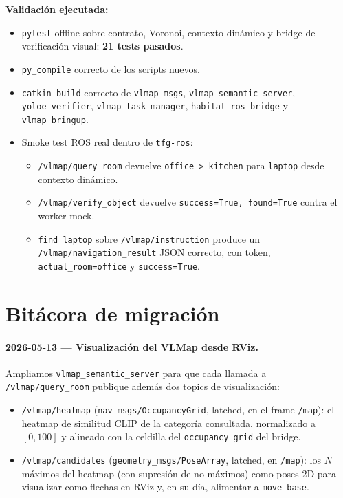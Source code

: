 \documentclass[11pt,a4paper]{article}
\begin{document}
\textbf{Validación ejecutada:}
\begin{itemize}
  \item \texttt{pytest} offline sobre contrato, Voronoi, contexto dinámico y
        bridge de verificación visual: \textbf{21 tests pasados}.
  \item \texttt{py\_compile} correcto de los scripts nuevos.
  \item \texttt{catkin build} correcto de
        \texttt{vlmap\_msgs}, \texttt{vlmap\_semantic\_server},
        \texttt{yoloe\_verifier}, \texttt{vlmap\_task\_manager},
        \texttt{habitat\_ros\_bridge} y \texttt{vlmap\_bringup}.
  \item Smoke test ROS real dentro de \texttt{tfg-ros}:
        \begin{itemize}
          \item \texttt{/vlmap/query\_room} devuelve
                \texttt{office > kitchen} para \texttt{laptop} desde contexto
                dinámico.
          \item \texttt{/vlmap/verify\_object} devuelve
                \texttt{success=True, found=True} contra el worker mock.
          \item \texttt{find laptop} sobre \texttt{/vlmap/instruction} produce
                un \texttt{/vlmap/navigation\_result} JSON correcto, con token,
                \texttt{actual\_room=office} y \texttt{success=True}.
        \end{itemize}
\end{itemize}

\section*{Bitácora de migración}

\paragraph{2026-05-13 — Visualización del VLMap desde RViz.}

Ampliamos \texttt{vlmap\_semantic\_server} para que cada llamada a
\texttt{/vlmap/query\_room} publique además dos topics de visualización:

\begin{itemize}
  \item \texttt{/vlmap/heatmap} (\texttt{nav\_msgs/OccupancyGrid}, latched,
        en el frame \texttt{/map}): el heatmap de similitud CLIP de la
        categoría consultada, normalizado a $[0, 100]$ y alineado con la
        celdilla del \texttt{occupancy\_grid} del bridge.
  \item \texttt{/vlmap/candidates} (\texttt{geometry\_msgs/PoseArray},
        latched, en \texttt{/map}): los $N$ máximos del heatmap (con
        supresión de no-máximos) como poses 2D para visualizar como flechas
        en RViz y, en su día, alimentar a \texttt{move\_base}.
\end{itemize}
\end{document}
